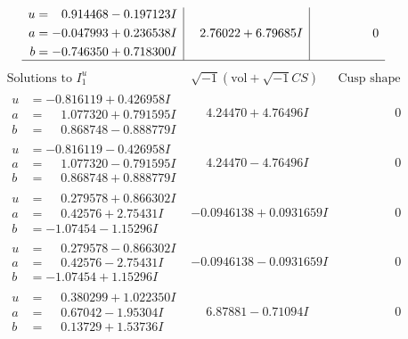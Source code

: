 \documentclass[1p]{elsarticle_modified}
\theoremstyle{definition}
\newcommand{\I}{\sqrt{-1}}
\begin{document}
$$\begin{array}{c|c|c}
\begin{aligned}
u &= \phantom{-}0.914468 - 0.197123 I \\
a &= -0.047993 + 0.236538 I \\
b &= -0.746350 + 0.718300 I\end{aligned}
 & \phantom{-}2.76022 + 6.79685 I & \phantom{-0.000000 } 0\\
 \hline 
 \end{array}$$\newpage$$\begin{array}{c|c|c}  
\text{Solutions to }I^u_{1}& \I (\text{vol} + \sqrt{-1}CS) & \text{Cusp shape}\\
 \hline 
\begin{aligned}
u &= -0.816119 + 0.426958 I \\
a &= \phantom{-}1.077320 + 0.791595 I \\
b &= \phantom{-}0.868748 - 0.888779 I\end{aligned}
 & \phantom{-}4.24470 + 4.76496 I & \phantom{-0.000000 } 0 \\ \hline\begin{aligned}
u &= -0.816119 - 0.426958 I \\
a &= \phantom{-}1.077320 - 0.791595 I \\
b &= \phantom{-}0.868748 + 0.888779 I\end{aligned}
 & \phantom{-}4.24470 - 4.76496 I & \phantom{-0.000000 } 0 \\ \hline\begin{aligned}
u &= \phantom{-}0.279578 + 0.866302 I \\
a &= \phantom{-}0.42576 + 2.75431 I \\
b &= -1.07454 - 1.15296 I\end{aligned}
 & -0.0946138 + 0.0931659 I & \phantom{-0.000000 } 0 \\ \hline\begin{aligned}
u &= \phantom{-}0.279578 - 0.866302 I \\
a &= \phantom{-}0.42576 - 2.75431 I \\
b &= -1.07454 + 1.15296 I\end{aligned}
 & -0.0946138 - 0.0931659 I & \phantom{-0.000000 } 0 \\ \hline\begin{aligned}
u &= \phantom{-}0.380299 + 1.022350 I \\
a &= \phantom{-}0.67042 - 1.95304 I \\
b &= \phantom{-}0.13729 + 1.53736 I\end{aligned}
 & \phantom{-}6.87881 - 0.71094 I & \phantom{-0.000000 } 0 \\ \hline\begin{aligned}

\end{aligned}
\end{array}$$
\end{document}
